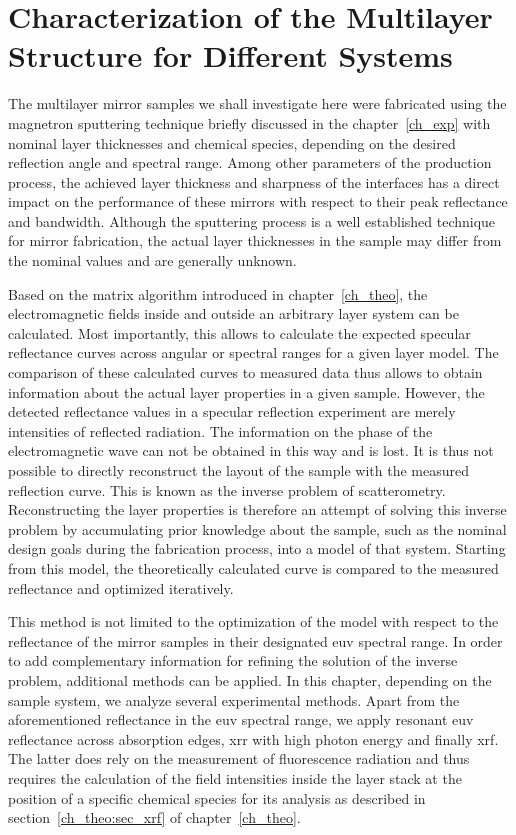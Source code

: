 
\chapter{Characterization of the Multilayer Structure for Different Systems} \label{ch_spec}
The multilayer mirror samples we shall investigate here were fabricated using the magnetron sputtering technique briefly discussed in the chapter~\ref{ch_exp} with nominal layer thicknesses and chemical species, depending on the desired reflection angle and spectral range. Among other parameters of the production process, the achieved layer thickness and sharpness of the interfaces has a direct impact on the performance of these mirrors with respect to their peak reflectance and bandwidth. Although the sputtering process is a well established technique for mirror fabrication, the actual layer thicknesses in the sample may differ from the nominal values and are generally unknown.

Based on the matrix algorithm introduced in chapter~\ref{ch_theo}, the electromagnetic fields   inside and outside an arbitrary layer system can be calculated. Most importantly, this allows to calculate the expected specular reflectance curves across angular or spectral ranges for a given layer model. The comparison of these calculated curves to measured data thus allows to obtain information about the actual layer properties in a given sample. However, the detected reflectance values in a specular reflection experiment are merely intensities of reflected radiation. The information on the phase of the electromagnetic wave can not be obtained in this way and is lost. It is thus not possible to directly reconstruct the layout of the sample with the measured reflection curve. This is known as the inverse problem of scatterometry. Reconstructing the layer properties is therefore an attempt of solving this inverse problem by accumulating prior knowledge about the sample, such as the nominal design goals during the fabrication process, into a model of that system. Starting from this model, the theoretically calculated curve is compared to the measured reflectance and optimized iteratively.

This method is not limited to the optimization of the model with respect to the reflectance of the mirror samples in their designated \gls{euv} spectral range. In order to add complementary information for refining the solution of the inverse problem, additional methods can be applied. In this chapter, depending on the sample system, we analyze several experimental methods. Apart from the aforementioned reflectance in the \gls{euv} spectral range, we apply resonant \gls{euv} reflectance across absorption edges, \gls{xrr} with high photon energy and finally \gls{xrf}. The latter does rely on the measurement of fluorescence radiation and thus requires the calculation of the field intensities inside the layer stack at the position of a specific chemical species for its analysis as described in section~\ref{ch_theo:sec_xrf} of chapter~\ref{ch_theo}.

